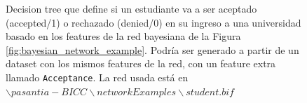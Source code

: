 \begin{figure}[ht]
    \centering
{}

    \caption{Decision tree que define si un estudiante va a ser aceptado (accepted/1) o rechazado (denied/0) en su ingreso a una universidad basado en los features de la red bayesiana de la Figura \ref{fig:bayesian_network_example}. Podría ser generado a partir de un dataset con los mismos features de la red, con un feature extra llamado \texttt{Acceptance}. La red usada está en $\backslash pasantia-BICC\backslash networkExamples \backslash student.bif$}
    \label{fig:decision_tree_example}
\end{figure}



